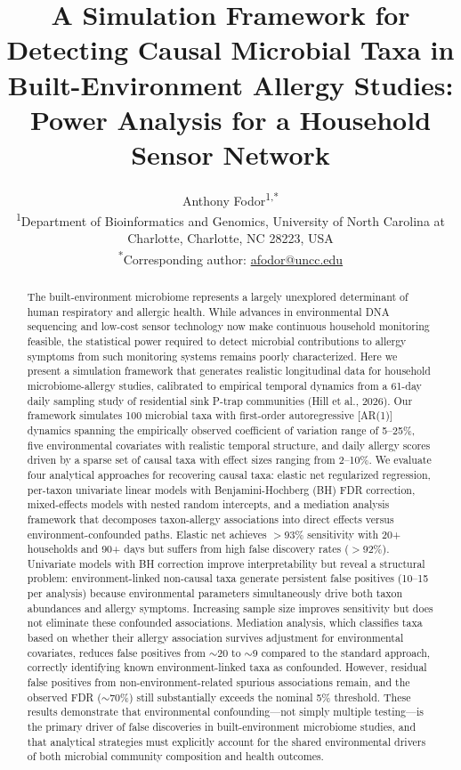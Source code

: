 \documentclass[11pt,letterpaper]{article}
\title{A Simulation Framework for Detecting Causal Microbial Taxa in Built-Environment Allergy Studies: Power Analysis for a Household Sensor Network}
\author{
Anthony Fodor\textsuperscript{1,*}
\\[6pt]
\textsuperscript{1}Department of Bioinformatics and Genomics, University of North Carolina at Charlotte, Charlotte, NC 28223, USA\\
\textsuperscript{*}Corresponding author: \href{mailto:afodor@uncc.edu}{afodor@uncc.edu}
}
\date{}
\begin{document}
\maketitle

\begin{abstract}
The built-environment microbiome represents a largely unexplored determinant of human respiratory and allergic health. While advances in environmental DNA sequencing and low-cost sensor technology now make continuous household monitoring feasible, the statistical power required to detect microbial contributions to allergy symptoms from such monitoring systems remains poorly characterized. Here we present a simulation framework that generates realistic longitudinal data for household microbiome-allergy studies, calibrated to empirical temporal dynamics from a 61-day daily sampling study of residential sink P-trap communities (Hill et al., 2026). Our framework simulates 100 microbial taxa with first-order autoregressive [AR(1)] dynamics spanning the empirically observed coefficient of variation range of 5--25\%, five environmental covariates with realistic temporal structure, and daily allergy scores driven by a sparse set of causal taxa with effect sizes ranging from 2--10\%. We evaluate four analytical approaches for recovering causal taxa: elastic net regularized regression, per-taxon univariate linear models with Benjamini-Hochberg (BH) FDR correction, mixed-effects models with nested random intercepts, and a mediation analysis framework that decomposes taxon-allergy associations into direct effects versus environment-confounded paths. Elastic net achieves $>$93\% sensitivity with 20+ households and 90+ days but suffers from high false discovery rates ($>$92\%). Univariate models with BH correction improve interpretability but reveal a structural problem: environment-linked non-causal taxa generate persistent false positives (10--15 per analysis) because environmental parameters simultaneously drive both taxon abundances and allergy symptoms. Increasing sample size improves sensitivity but does not eliminate these confounded associations. Mediation analysis, which classifies taxa based on whether their allergy association survives adjustment for environmental covariates, reduces false positives from $\sim$20 to $\sim$9 compared to the standard approach, correctly identifying known environment-linked taxa as confounded. However, residual false positives from non-environment-related spurious associations remain, and the observed FDR ($\sim$70\%) still substantially exceeds the nominal 5\% threshold. These results demonstrate that environmental confounding---not simply multiple testing---is the primary driver of false discoveries in built-environment microbiome studies, and that analytical strategies must explicitly account for the shared environmental drivers of both microbial community composition and health outcomes.
\end{abstract}
\end{document}
